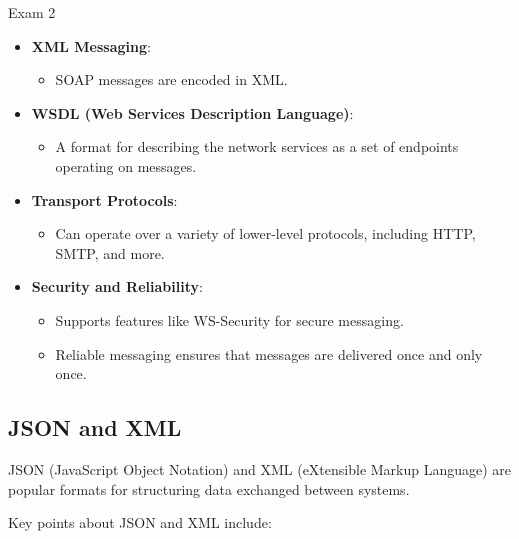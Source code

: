 \begin{examnotes}{Exam 2}
\begin{highlight}
        \begin{itemize}
            \item \textbf{XML Messaging}:
                \begin{itemize}
                    \item SOAP messages are encoded in XML.
                \end{itemize}
            \item \textbf{WSDL (Web Services Description Language)}:
                \begin{itemize}
                    \item A format for describing the network services as a set of endpoints operating on messages.
                \end{itemize}
            \item \textbf{Transport Protocols}:
                \begin{itemize}
                    \item Can operate over a variety of lower-level protocols, including HTTP, SMTP, and more.
                \end{itemize}
            \item \textbf{Security and Reliability}:
                \begin{itemize}
                    \item Supports features like WS-Security for secure messaging.
                    \item Reliable messaging ensures that messages are delivered once and only once.
                \end{itemize}
        \end{itemize}
    \end{highlight}
    
    \subsection*{JSON and XML}
    
    JSON (JavaScript Object Notation) and XML (eXtensible Markup Language) are popular formats for structuring data exchanged between systems.
    
    \begin{highlight}
        Key points about JSON and XML include:
        

\end{highlight}
\end{examnotes}
